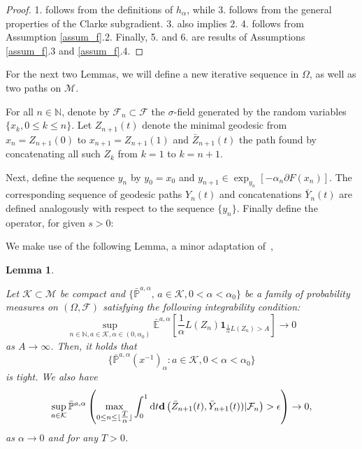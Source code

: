\documentclass{article}
\newtheorem{lemma}{Lemma}
\newcommand{\CK}{\mathcal{K}}
\newcommand{\rd}{\mathrm{d}}
\newcommand{\bd}{\mathbf{d}}
\DeclarePairedDelimiter\floor{\lfloor}{\rfloor}
\begin{document}
\begin{proof}
1. follows from the definitions of $h_{\alpha}$, while 3. follows from the general properties of the Clarke subgradient. 3. also implies 2. 4. follows from Assumption \ref{assum_f}.2. Finally, 5. and 6. are results of Assumptions \ref{assum_f}.3 and \ref{assum_f}.4. 
\end{proof}

For the next two Lemmas, we will define a new iterative sequence in $\Omega$, as well as two paths on $\mathcal{M}$.

For all $n\in\mathbb{N}$, denote by $\mathcal{F}_n\subset\mathcal{F}$ the $\sigma$-field generated by the random variables $\{x_k,0\le k\le n\}$. Let $Z_{n+1}(t)$ denote the minimal geodesic from $x_n=Z_{n+1}(0)$ to $x_{n+1}=Z_{n+1}(1)$ and $\bar{Z}_{n+1}(t)$ the path found by concatenating all such $Z_k$ from $k=1$ to $k=n+1$. 

Next, define the sequence $y_n$ by $y_0=x_0$ and $y_{n+1}\in \exp_{y_n}\left[-\alpha_n \partial F(x_n)\right]$. The corresponding sequence of geodesic paths $Y_n(t)$ and concatenations $\bar Y_n(t)$ are defined analogously with respect to the sequence $\{y_n\}$.
Finally define the operator, for given $s>0$:


We make use of the following Lemma, a minor adaptation of~\cite[Lemma 6.2]{bianchi2019constant},
\begin{lemma}\label{lemma:uniform_int}

Let $\CK\subset \mathcal{M}$ be compact and $\{\bar{\mathbb{P}}^{a,\alpha},\,a\in \CK,0<\alpha<\alpha_0\}$ be a family of probability measures on $(\Omega,\mathcal{F})$ satisfying the following integrability condition:    
\[
\sup\limits_{n\in\mathbb{N},a\in \CK,\alpha\in(0,\alpha_0)}\bar{\mathbb{E}}^{a,\alpha}\left[ \frac{1}{\alpha}L(Z_n)\mathbf{1}_{\frac{1}{\alpha}L(Z_n)>A}\right] \to 0
\]
as $A\to \infty$. Then, it holds that 
\[
\{\bar{\mathbb{P}}^{a,\alpha} (x^{-1})_{\alpha}: a\in \CK,0<\alpha<\alpha_0\}
\]
is tight. We also have
\begin{equation}
    \sup_{a\in\CK}\bar{\mathbb{P}}^{a,\alpha}\left(\max_{0\leq n\leq \floor{\tfrac{T}{\alpha}}} \int_0^1 \rd t \bd\left(\bar{Z}_{n+1}(t),\bar{Y}_{n+1}(t))|\mathcal{F}_n\right)>\epsilon\right)\to  0,
\end{equation}
as $\alpha\to0$ and for any $T>0$.
\end{lemma}
\end{document}
